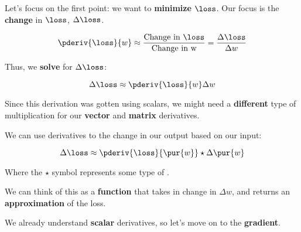         Let's focus on the first point: we want to \textbf{minimize} $\loss$. Our focus is the \textbf{change} in $\loss$, $\Delta \loss$.
        
        \begin{equation}
            \pderiv{\loss}{w} 
            \approx 
            \frac{\text{Change in }\loss }{ \text{Change in w} }
            =
            \frac{\Delta \loss}{ \Delta w}
        \end{equation}
        
        Thus, we \textbf{solve} for $\Delta \loss$:
        
        \begin{equation}
            \Delta \loss
            \approx
            \pderiv{\loss}{w} 
            \Delta w
        \end{equation}
        
        Since this derivation was gotten using scalars, we might need a \textbf{different} type of multiplication for our \textbf{vector} and \textbf{matrix} derivatives.\\
        
        \begin{concept}
            We can use derivatives to  the change in our output based on our input:
            
            \begin{equation*}
                \Delta \loss
                \approx
                \pderiv{\loss}{\pur{w}} 
                \star
                \Delta \pur{w}
            \end{equation*}
            
            Where the $\star$ symbol represents some type of .
            
        \end{concept}
        
        We can think of this as a \textbf{function} that takes in change in $\Delta w$, and returns an \textbf{approximation} of the loss.
        
        We already understand \textbf{scalar} derivatives, so let's move on to the \textbf{gradient}.